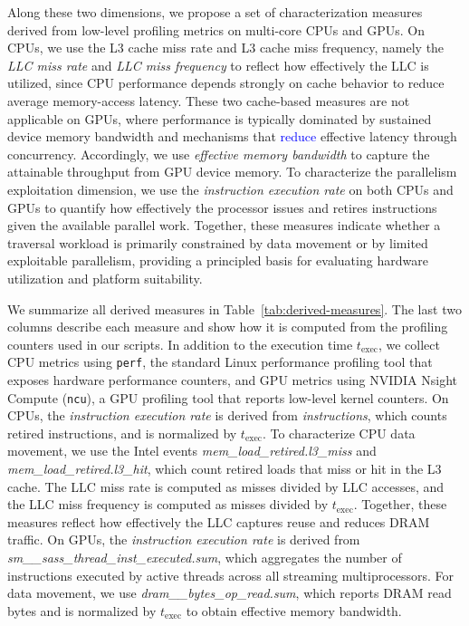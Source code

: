 Along these two dimensions, we propose a set of characterization measures derived from low-level profiling metrics on multi-core CPUs and GPUs.
On CPUs, we use the L3 cache miss rate and L3 cache miss frequency, namely the \emph{LLC miss rate} and \emph{LLC miss frequency} to reflect how effectively the LLC is utilized, since CPU performance depends strongly on cache behavior to reduce average memory-access latency. 
These two cache-based measures are not applicable on GPUs, where performance is typically dominated by sustained device memory bandwidth and mechanisms that \textcolor{blue}{reduce} effective latency through concurrency.
Accordingly, we use \emph{effective memory bandwidth} to capture the attainable throughput from GPU device memory.
To characterize the parallelism exploitation dimension, we use the \emph{instruction execution rate} on both CPUs and GPUs to quantify how effectively the processor issues and retires instructions given the available parallel work.
Together, these measures indicate whether a traversal workload is primarily constrained by data movement or by limited exploitable parallelism, providing a principled basis for evaluating hardware utilization and platform suitability.


\newcommand{\mcode}[1]{\text{\ttfamily\url{#1}}} %
\newcommand{\per}[2]{#1\,/\,#2}



We summarize all derived measures in Table~\ref{tab:derived-measures}. 
The last two columns describe each measure and show how it is computed from the profiling counters used in our scripts.
In addition to the execution time $t_{\text{exec}}$, we collect CPU metrics using \texttt{perf}, the standard Linux performance profiling tool that exposes hardware performance counters, and GPU metrics using NVIDIA Nsight Compute (\texttt{ncu}), a GPU profiling tool that reports low-level kernel counters.
On CPUs, the \emph{instruction execution rate} is derived from \emph{instructions}, which counts retired instructions, and is normalized by $t_{\text{exec}}$. 
To characterize CPU data movement, we use the Intel events \emph{mem\_load\_retired.l3\_miss} and \emph{mem\_load\_retired.l3\_hit}, which count retired loads that miss or hit in the L3 cache. 
The LLC miss rate is computed as misses divided by LLC accesses, and the LLC miss frequency is computed as misses divided by $t_{\text{exec}}$. Together, these measures reflect how effectively the LLC captures reuse and reduces DRAM traffic.
On GPUs, the \emph{instruction execution rate} is derived from
\emph{sm\_\_sass\_thread\_inst\_executed.sum}, which aggregates the number of instructions executed by active threads across all streaming multiprocessors.
For data movement, we use \emph{dram\_\_bytes\_op\_read.sum}, which reports DRAM read bytes and is normalized by $t_{\text{exec}}$ to obtain effective memory bandwidth.

